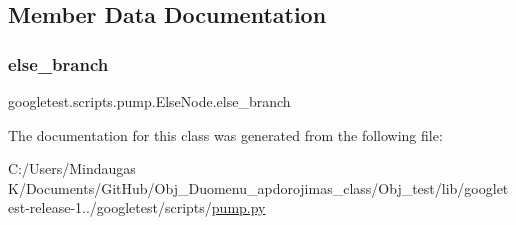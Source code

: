 \subsection{Member Data Documentation}
\mbox{\label{classgoogletest_1_1scripts_1_1pump_1_1_else_node_a251194d9a9f9d045e963da94b44b5326}} 
\subsubsection{\texorpdfstring{else\_branch}{else\_branch}}
{\footnotesize\ttfamily googletest.\+scripts.\+pump.\+Else\+Node.\+else\+\_\+branch}



The documentation for this class was generated from the following file\+:\begin{DoxyCompactItemize}
\item 
C\+:/\+Users/\+Mindaugas K/\+Documents/\+Git\+Hub/\+Obj\+\_\+\+Duomenu\+\_\+apdorojimas\+\_\+class/\+Obj\+\_\+test/lib/googletest-\/release-\/1../googletest/scripts/\mbox{\hyperlink{_obj__test_2lib_2googletest-release-1_88_81_2googletest_2scripts_2pump_8py}{pump.\+py}}\end{DoxyCompactItemize}
